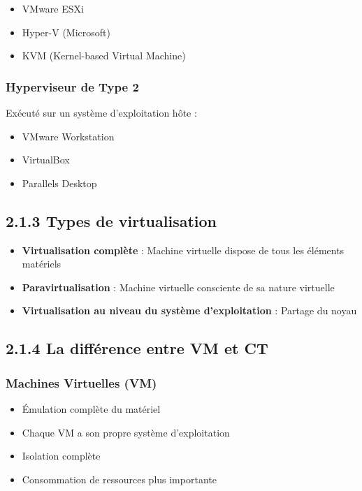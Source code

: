 \documentclass[12pt,a4paper]{report}
\begin{document}
\begin{itemize}
    \item VMware ESXi
    \item Hyper-V (Microsoft)
    \item KVM (Kernel-based Virtual Machine)
\end{itemize}

\subsubsection{Hyperviseur de Type 2}

Exécuté sur un système d'exploitation hôte :

\begin{itemize}
    \item VMware Workstation
    \item VirtualBox
    \item Parallels Desktop
\end{itemize}

\subsection{2.1.3 Types de virtualisation}

\begin{itemize}
    \item \textbf{Virtualisation complète} : Machine virtuelle dispose de tous les éléments matériels
    \item \textbf{Paravirtualisation} : Machine virtuelle consciente de sa nature virtuelle
    \item \textbf{Virtualisation au niveau du système d'exploitation} : Partage du noyau
\end{itemize}

\subsection{2.1.4 La différence entre VM et CT}

\subsubsection{Machines Virtuelles (VM)}

\begin{itemize}
    \item Émulation complète du matériel
    \item Chaque VM a son propre système d'exploitation
    \item Isolation complète
    \item Consommation de ressources plus importante
\end{itemize}
\end{document}
